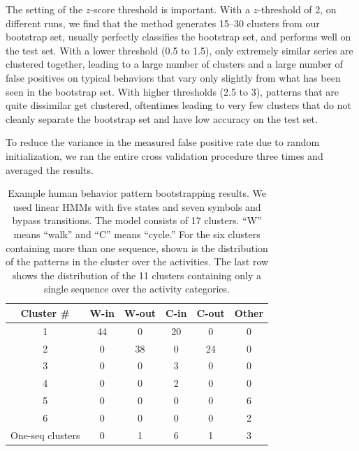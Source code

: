 The setting of the $z$-score threshold is important. With a $z$-threshold 
of 2, on different runs, we find that the method generates 15--30
clusters from our bootstrap set, usually perfectly classifies the
bootstrap set, and performs well on the test set. With a lower
threshold (0.5 to 1.5), only extremely similar series are clustered
together, leading to a large number of clusters and a large number of
false positives on typical behaviors that vary only slightly from what
has been seen in the bootstrap set. With higher thresholds (2.5 to 3),
patterns that are quite dissimilar get clustered, oftentimes leading
to very few clusters that do not cleanly separate the bootstrap set
and have low accuracy on the test set.

To reduce the variance in the measured false positive rate due to
random initialization, we ran the entire cross validation procedure
three times and averaged the results.

\begin{table}[t]
  \caption[Example human behavior pattern bootstrapping
    results.]{\small Example human behavior pattern bootstrapping
    results. We used linear HMMs with five states and seven
    symbols and bypass transitions. The model consists of 17 clusters. 
    ``W'' means ``walk''
    and ``C'' means ``cycle.'' For the six clusters containing more
    than one sequence, shown is the distribution of the patterns in
    the cluster over the activities.  The last row shows the
    distribution of the 11 clusters containing only a single sequence
    over the activity categories.}
  \begin{center}
    \begin{tabular}{c|c|c|c|c|c}
      \hline
      Cluster \# & W-in & W-out & C-in & C-out & Other \\
      \hline \hline
      1 & 44 & 0  & 20 & 0  & 0 \\ \hline
      2 & 0  & 38 & 0  & 24 & 0 \\ \hline
      3 & 0  & 0  & 3  & 0  & 0 \\ \hline
      4 & 0  & 0  & 2  & 0  & 0 \\ \hline
      5 & 0  & 0  & 0  & 0  & 6 \\ \hline
      6 & 0  & 0  & 0  & 0  & 2 \\ \hline
      One-seq clusters & 0 & 1 & 6 & 1 & 3 \\ \hline
    \end{tabular}
  \end{center}
  \label{tab:bootstrapping-results}
\end{table}

